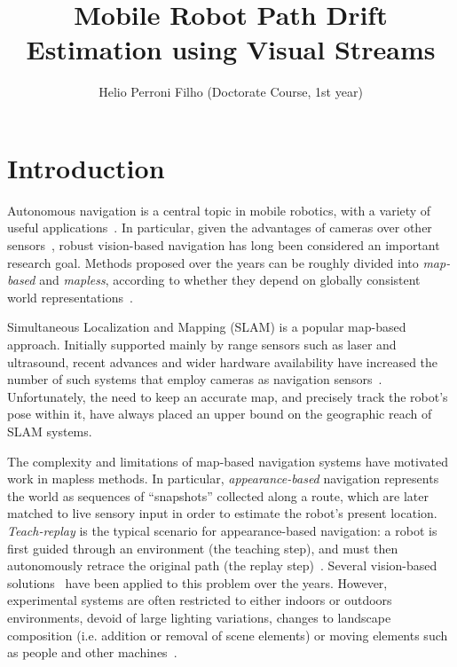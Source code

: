\documentclass[twocolumn, 9pt,fleqn]{jsproceedings}
\title{Mobile Robot Path Drift Estimation using Visual Streams}
\author{Helio Perroni Filho (Doctorate Course, 1st year)\authorrefmark{1}}
\affiliation{Intelligent Robotics Laboratory, OHYA's group}
\begin{document}
\thispagestyle{myheadings}
\maketitle


\section{Introduction}

Autonomous navigation is a central topic in mobile robotics, with a variety of useful applications~\cite{BON02,ARK90}. In particular, given the advantages of cameras over other sensors~\cite{BON02,DAV07}, robust vision-based navigation has long been considered an important research goal. Methods proposed over the years can be roughly divided into \textit{map-based} and \textit{mapless}, according to whether they depend on globally consistent world representations~\cite{BON02}.

Simultaneous Localization and Mapping (SLAM) is a popular map-based approach. Initially supported mainly by range sensors such as laser and ultrasound, recent advances and wider hardware availability have increased the number of such systems that employ cameras as navigation sensors~\cite{DAV07,CUM08}. Unfortunately, the need to keep an accurate map, and precisely track the robot's pose within it, have always placed an upper bound on the geographic reach of SLAM systems.

The complexity and limitations of map-based navigation systems have motivated work in mapless methods. In particular, \textit{appearance-based} navigation represents the world as sequences of ``snapshots'' collected along a route, which are later matched to live sensory input in order to estimate the robot's present location. \textit{Teach-replay} is the typical scenario for appearance-based navigation: a robot is first guided through an environment (the teaching step), and must then autonomously retrace the original path (the replay step)~\cite{BUR01}. Several vision-based solutions~\cite{BUR01,OYA96,MAT96,LAM00,VAR05,CHE06,KIM08,STE12,MIL12} have been applied to this problem over the years. However, experimental systems are often restricted to either indoors or outdoors environments, devoid of large lighting variations, changes to landscape composition (i.e. addition or removal of scene elements) or moving elements such as people and other machines~\cite{KIM08}.
\end{document}
